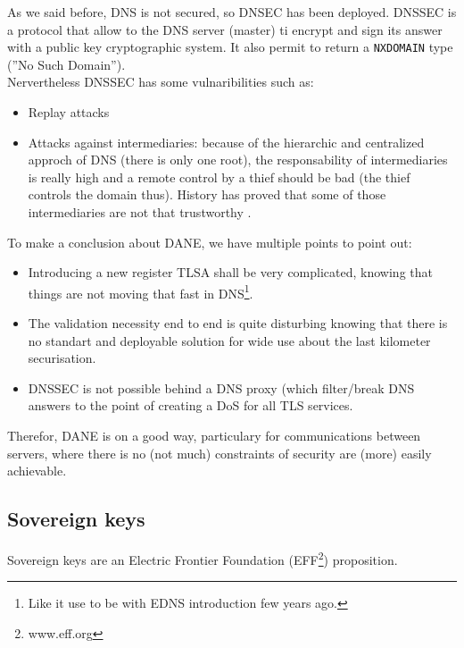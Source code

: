 \documentclass[journal, a4paper]{IEEEtran}
\begin{document}
As we said before, DNS is not secured, so DNSEC has been deployed. DNSSEC is a protocol that allow to the DNS server (master) ti encrypt and sign its answer with a public key cryptographic system. It also permit to return a \verb$NXDOMAIN$ type (''No Such Domain'').\\
Nervertheless DNSSEC has some vulnaribilities such as:
\begin{itemize}
	\item Replay attacks
	\item Attacks against intermediaries: because of the hierarchic and centralized approch of DNS (there is only one root), the responsability of intermediaries is really high and a remote control by a thief should be bad (the thief controls the domain thus). History has proved that some of those intermediaries are not that trustworthy \cite{dan08} \cite{utk11}.
\end{itemize}

To make a conclusion about DANE, we have multiple points to point out:
\begin{itemize}
	\item Introducing a new register TLSA shall be very complicated, knowing that things are not moving that fast in DNS\footnote{Like it use to be with EDNS introduction few years ago.}.
	\item The validation necessity end to end is quite disturbing knowing that there is no standart and deployable solution for wide use  about the last kilometer securisation.
	\item DNSSEC is not possible behind a DNS proxy (which filter/break DNS answers to the point of creating a DoS for all TLS services.
\end{itemize}

Therefor, DANE is on a good way, particulary for communications between servers, where there is no (not much) constraints of security are (more) easily achievable. 

\subsection{Sovereign keys}
\label{sovkeys}

Sovereign keys are an Electric Frontier Foundation (EFF\footnote{www.eff.org}) proposition.
\end{document}
